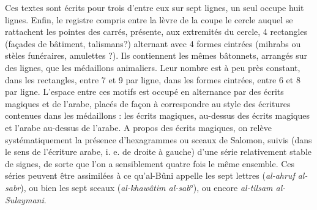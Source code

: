Ces textes sont écrits pour trois d'entre eux sur sept lignes, un seul occupe huit lignes. Enfin, le registre compris entre la lèvre de la coupe le cercle auquel se rattachent les pointes des carrés, présente, aux extremités du cercle, 4 rectangles (façades de bâtiment, talismans?) alternant avec  4 formes cintrées (mihrabs ou stèles funéraires, amulettes ?). Ils contiennent les mêmes bâtonnets, arrangés sur des lignes, que les médaillons animaliers. Leur nombre est à peu près constant, dans les rectangles, entre 7 et 9 par ligne, dans les formes cintrées, entre 6 et 8 par ligne. L'espace entre ces motifs est occupé en alternance par des écrits magiques et de l'arabe, placés de façon à correspondre au style des écritures contenues dans les médaillons : les écrits magiques, au-dessus des écrits magiques et l'arabe au-dessus de l'arabe. A propos des écrits magiques, on relève systématiquement la présence d'hexagrammes ou sceaux de Salomon, suivis (dans le sens de l'écriture arabe, i. e. de droite à gauche) d'une série relativement stable de signes, de sorte que l'on a sensiblement quatre fois le même ensemble. Ces séries peuvent être assimilées à ce qu'al-Bûni appelle les sept lettres (\textit{al-ahruf al-sabr}), ou bien les
sept sceaux (\textit{al-khawâtim al-sab}°), ou encore \textit{al-tilsam al-Sulaymani}. 

